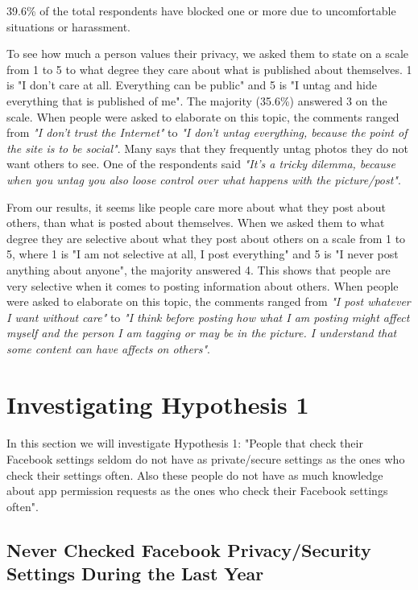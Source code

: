 39.6\% of the total respondents have blocked one or more due to uncomfortable situations or harassment. 

To see how much a person values their privacy, we asked them to state on a scale from 1 to 5 to what degree they care about what is published about themselves. 1 is "I don't care at all. Everything can be public" and 5 is "I untag and hide everything that is published of me". The majority (35.6\%) answered 3 on the scale.  When people were asked to elaborate on this topic, the comments ranged from \textit{"I don't trust the Internet"} to \textit{"I don't untag everything, because the point of the site is to be social"}. Many says that they frequently untag photos they do not want others to see. One of the respondents said \textit{"It's a tricky dilemma, because when you untag you also loose control over what happens with the picture/post"}.

From our results, it seems like people care more about what they post about others, than what is posted about themselves. When we asked them to what degree they are selective about what they post about others on a scale from 1 to 5, where 1 is "I am not selective at all, I post everything" and 5 is "I never post anything about anyone", the majority answered 4. This shows that people are very selective when it comes to posting information about others. When people were asked to elaborate on this topic, the comments ranged from \textit{"I post whatever I want without care"} to \textit{"I think before posting how what I am posting might affect myself and the person I am tagging or may be in the picture. I understand that some content can have affects on others"}.

\section{Investigating Hypothesis 1}

\paragraph{}
In this section we will investigate Hypothesis 1: "People that check their Facebook settings seldom do not have as private/secure settings as the ones who check their settings often. Also these people do not have as much knowledge about app permission requests as the ones who check their Facebook settings often".


\subsection{Never Checked Facebook Privacy/Security Settings During the Last Year}

